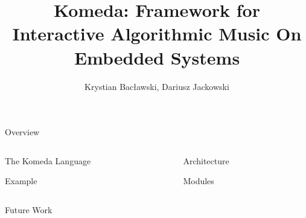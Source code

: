\documentclass[final,hyperref={pdfpagelabels=false}]{beamer}
\title[Komeda]{Komeda: Framework for Interactive Algorithmic Music On Embedded
  Systems}
\author[Baclawski & Jackowski]{Krystian Bac\l awski, Dariusz Jackowski}
\institute[University of Wroclaw]{University of Wroc\l aw\\ Institute of the Computer Science, Wroc\l aw, Poland}
\begin{document}
  \begin{frame}{} 

    \begin{block}{\large Overview}
	
    \end{block}
    \begin{columns}[t]
      \begin{column}{.49\linewidth}
        \begin{block}{The Komeda Language}
         
\end{block}
	        \begin{block}{Example}
	         
        \end{block}
        
      \end{column}
      \begin{column}{.49\linewidth}
        \begin{block}{Architecture}
         
        \end{block}
        \begin{block}{Modules}

        \end{block}

      \end{column}
    \end{columns}

 

    \begin{block}{\large Future Work}


    \end{block}

  \end{frame}
\end{document}
